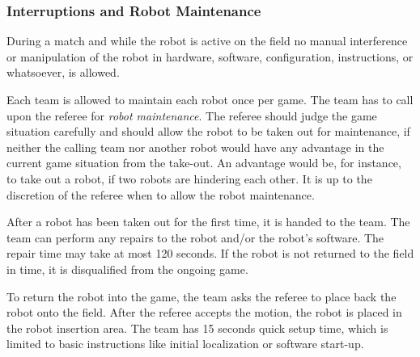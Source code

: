 \documentclass[12pt,twoside]{article}
\begin{document}

\subsubsection{Interruptions and Robot Maintenance}
\label{sec:robot-maintenance}
During a match and while the robot is active on the field no manual
interference or manipulation of the robot in hardware, software,
configuration, instructions, or whatsoever, is allowed.


Each team is allowed to maintain each robot once per game. The team
has to call upon the referee for \textit{robot maintenance}. The
referee should judge the game situation carefully and should allow the
robot to be taken out for maintenance, if neither the calling team
nor another robot would have any advantage in the current game
situation from the take-out. An advantage would be, for instance, to
take out a robot, if two robots are hindering each other. It is up to
the discretion of the referee when to allow the robot maintenance.


After a robot has been taken out for the first time, it is handed to
the team. The team can perform any repairs to the robot and/or the
robot's software. %
The repair time may take at most 120 seconds. If the robot is not
returned to the field in time, it is disqualified from the ongoing
game.

To return the robot into the game, the team asks the referee to place
back the robot onto the field. After the referee accepts the motion,
the robot is placed in the robot insertion area. The team has 15
seconds quick setup time, which is limited to basic instructions like
initial localization or software start-up.
\end{document}
